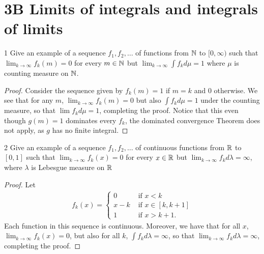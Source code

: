 \section{3B Limits of integrals and integrals of limits}


\begin{exercise}{1}
Give an example of a sequence $f_1, f_2, \dots$ of functions from $\mathbb{N}$ to $[0, \infty)$ such that $\lim_{k \to \infty} f_k(m) = 0$ for every $m \in \mathbb{N}$ but $\lim_{k \to \infty} \int f_k d\mu = 1$ where $\mu$ is counting measure on $\mathbb{N}$.
\end{exercise}
\begin{proof}
Consider the sequence given by $f_k(m) = 1$ if $m = k$ and 0 otherwise.
We see that for any $m$, $\lim_{k \to \infty} f_k(m) = 0$ but also $\int f_k d\mu = 1$ under the counting measure, so that $\lim f_k d\mu = 1$, completing the proof.
Notice that this even though $g(m) = 1$ dominates every $f_k$, the dominated convergence Theorem does not apply, as $g$ has no finite integral.
\end{proof} 

\begin{exercise}{2}
Give an example of a sequence $f_1, f_2, \dots$ of continuous functions from $\mathbb{R}$ to $[0,1]$ such that $\lim_{k \to \infty} f_k(x) = 0$ for every $x \in \mathbb{R}$ but $\lim_{k \to \infty} f_k d\lambda = \infty$, where $\lambda$ is Lebesgue measure on $\mathbb{R}$
\end{exercise}
\begin{proof}
Let 
\begin{align*}
    f_k(x) = 
    \begin{cases}
        0   &\text{ if }    x < k\\
        x-k &\text{ if }  x \in [k, k+1]\\
        1   &\text{ if }    x > k+1.
    \end{cases}
\end{align*}
Each function in this sequence is continuous.
Moreover, we have that for all $x$, $\lim_{k \to \infty} f_k(x) = 0$, but also for all $k$, $\int f_k d\lambda = \infty$, so that $\lim_{k \to \infty} f_k d\lambda = \infty$, completing the proof.
\end{proof} 

